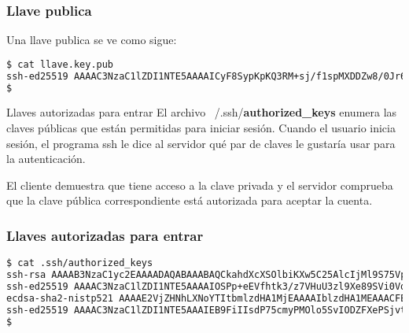 \begin{frame}[fragile]
  \frametitle{Llave publica}

  Una llave publica se ve como sigue:

  \vspace{\baselineskip}
  \begin{lstlisting}[language=Bash,basicstyle={\footnotesize\ttfamily}]
$ cat llave.key.pub 
ssh-ed25519 AAAAC3NzaC1lZDI1NTE5AAAAICyF8SypKpKQ3RM+sj/f1spMXDDZw8/0Jr6Y6jkqz4wR tu@correo.com
$
  \end{lstlisting}
\end{frame}

\begin{frame}[c]{Llaves autorizadas para entrar}
  El archivo ~/.ssh/\textbf{authorized\_keys} enumera las claves
  públicas que están permitidas para iniciar sesión. Cuando el
  usuario inicia sesión, el programa ssh le dice al servidor qué
  par de claves le gustaría usar para la autenticación.

  \vspace{\baselineskip}
  El cliente demuestra que tiene acceso a la clave privada y el servidor
  comprueba que la clave pública correspondiente está autorizada para
  aceptar la cuenta.
\end{frame}

\begin{frame}[fragile]
  \frametitle{Llaves autorizadas para entrar}

  \begin{lstlisting}[language=Bash,basicstyle={\footnotesize\ttfamily}]
$ cat .ssh/authorized_keys 
ssh-rsa AAAAB3NzaC1yc2EAAAADAQABAAABAQCkahdXcXSOlbiKXw5C25AlcIjMl9S75Vpp8w11IeJXblF6p25eD/zixHvZ6DriHvnOQfQ5ppBAmROUCjAyLGGFqb3J+nogqJVLjMyzyfV4m8G3zN6RXXc0prQ7t0t1Dv7qwgwaTWwkNI7JrVFOykDNIbU6ZJuqPT8jg4ChIoL9A9OzA2uiFOv2Bwh0qGEsqsBONvpe/wAJg1l85jraGGB/todkmZJdcQ6q6gnl4KKVrKeafwmoR4/KxX1P6uFJywbyOqk3g/x4GfDYyZN5TDiph0d0jFQz2JxvywcIxBp1rbwnkH219yIyjSqzyYPTtt2TvrETdSqzzVx11SNO8Jr miguel@correo.com
ssh-ed25519 AAAAC3NzaC1lZDI1NTE5AAAAIOSPp+eEVfhtk3/z7VHuU3zl9Xe89SVi0VqeG9Nezsh miguel.bernal@correo.com
ecdsa-sha2-nistp521 AAAAE2VjZHNhLXNoYTItbmlzdHA1MjEAAAAIblzdHA1MEAAACFBAA12GxzSywo9vH2cAGdV92V5ZCu+APydWgTPjuQsi8cRzZjloNIV3VV0XlAhF4pSpEwBeQVPA+O9MWKRQZwS7AFSzFmPDUDhxKQ4+Z1H5vwRIb3NTd7DaEq/4uNkNHBNjsbwoc24D2fZ6Va4uV7AA9FgzD0fT3wDfeyvClP2/zrZg== miguel@correo.com_otro_servidor
ssh-ed25519 AAAAC3NzaC1lZDI1NTE5AAAIEB9FiIIsdP75cmyPMOlo5SvIODZFXePSjvtdRwG5L mG60
$
  \end{lstlisting}
\end{frame}

